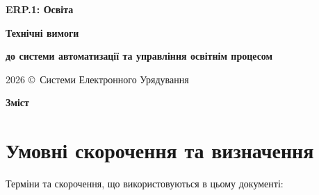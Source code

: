 \documentclass{article}
\newcommand\HUGE[1]{\fontsize{40}{40}\selectfont #1}
\begin{document}
\pagestyle{fancy}

\begin{titlepage}
  \AddToShipoutPictureBG*{\AtPageLowerLeft{\color{nato}\rule{\paperwidth}{\paperheight}}}
  \color{white}\thispagestyle{empty}\vspace*{4cm}\centering
  {\Huge  \textbf{ERP.1: Освіта} \par} \vspace{2cm}
  {\HUGE  \textbf{Технічні вимоги} \par} \vspace{2.5cm}
  {\LARGE \textbf{до системи автоматизації та управління освітнім процесом} \par} \vspace{2.5cm}
  \vfill
  {\large 2026 \copyright\ Системи Електронного Урядування \par}
\end{titlepage}

\newpage

\begin{center}
  {\Huge\color{nato}\bfseries Зміст\par}
\end{center}
\vspace{40pt}
\tableofcontents

\begin{abstract}
  У цьому документі наведено детальні технічні вимоги до підсистеми ERP.1: Освіта, яка розробляється як сучасна LMS/EMS-платформа на базі Erlang/OTP. Вимоги розроблено згідно з Політиками Технічних вимог, ТЗ та ТД (ДСТУ 3973-2000, ДСТУ 3008:2015 та ISO/IEC/IEEE 42010). Документ визначає повний перелік довідників, реєстрових сутностей, бізнес-процесів (включаючи навчальні плани, електронний журнал, оцінювання та генерацію розкладу занять), рольову модель доступів на базі ABAC, а також нефункціональні вимоги до архітектури, безпеки (КЕП CAdES-X Long), продуктивності та логування.
\end{abstract}

\newpage

\section{Умовні скорочення та визначення}

Терміни та скорочення, що використовуються в цьому документі:
\end{document}
